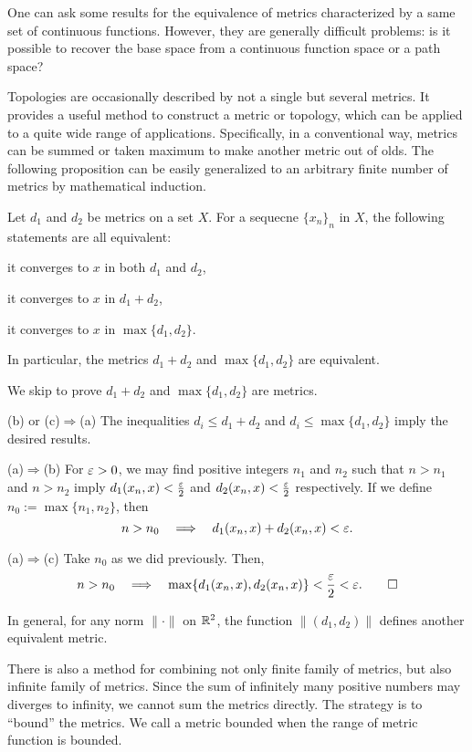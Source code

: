 \documentclass{../note}
\begin{document}
One can ask some results for the equivalence of metrics characterized by a same set of continuous functions.
However, they are generally difficult problems: is it possible to recover the base space from a continuous function space or a path space?


Topologies are occasionally described by not a single but several metrics.
It provides a useful method to construct a metric or topology, which can be applied to a quite wide range of applications.
Specifically, in a conventional way, metrics can be summed or taken maximum to make another metric out of olds.
The following proposition can be easily generalized to an arbitrary finite number of metrics by mathematical induction.

\begin{prop}
Let $d_1$ and $d_2$ be metrics on a set $X$.
For a sequecne $\{x_n\}_n$ in $X$, the following statements are all equivalent:
\begin{parts}
\item it converges to $x$ in both $d_1$ and $d_2$,
\item it converges to $x$ in $d_1+d_2$,
\item it converges to $x$ in $\max\{d_1,d_2\}$.
\end{parts}
In particular, the metrics $d_1+d_2$ and $\max\{d_1,d_2\}$ are equivalent.
\end{prop}
\begin{pf}
We skip to prove $d_1+d_2$ and $\max\{d_1,d_2\}$ are metrics.

(b) or (c)$\Rightarrow$(a)
The inequalities $d_i\le d_1+d_2$ and $d_i\le\max\{d_1,d_2\}$ imply the desired results.

(a)$\Rightarrow$(b)
For $\varepsilon>0$, we may find positive integers $n_1$ and $n_2$ such that $n>n_1$ and $n>n_2$ imply $d_1(x_n,x)<\frac{\varepsilon}2$ and $d_2(x_n,x)<\frac{\varepsilon}2$ respectively.
If we define $n_0:=\max\{n_1,n_2\}$, then
\[n>n_0\impl d_1(x_n,x)+d_2(x_n,x)<\e.\]

(a)$\Rightarrow$(c)
Take $n_0$ as we did previously.
Then,
\[n>n_0\impl\max\{d_1(x_n,x),d_2(x_n,x)\}<\frac\e2<\e.\qedhere\]
\end{pf}

\begin{rmk}
In general, for any norm $\|\cdot\|$ on $\mathbb{R}^2$, the function $\|(d_1,d_2)\|$ defines another equivalent metric.
\end{rmk}

There is also a method for combining not only finite family of metrics, but also infinite family of metrics.
Since the sum of infinitely many positive numbers may diverges to infinity, we cannot sum the metrics directly.
The strategy is to ``bound'' the metrics.
We call a metric bounded when the range of metric function is bounded.
\end{document}
